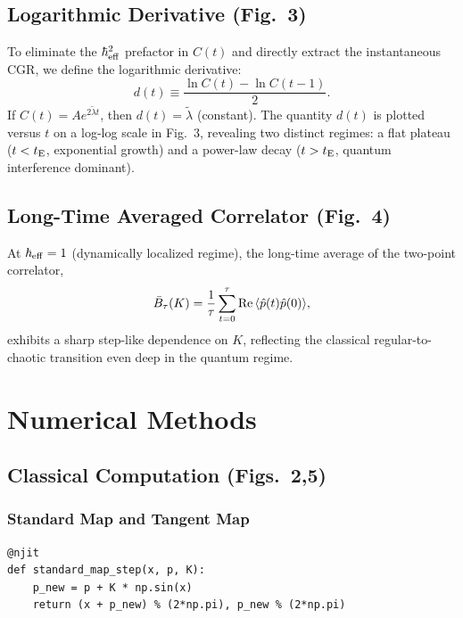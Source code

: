 \documentclass[11pt,a4paper]{article}
\newcommand{\hb}{\hbar_{\rm eff}}
\begin{document}
\subsection{Logarithmic Derivative (Fig.~3)}

To eliminate the $\hb^{2}$ prefactor in $C(t)$ and directly extract the instantaneous CGR, we define the logarithmic derivative:
\begin{equation}\label{eq:logderiv}
d(t)\equiv\frac{\ln C(t)-\ln C(t-1)}{2}.
\end{equation}
If $C(t)=A e^{2\tilde{\lambda}t}$, then $d(t)=\tilde{\lambda}$ (constant). The quantity $d(t)$ is plotted versus $t$ on a log-log scale in Fig.~3, revealing two distinct regimes: a flat plateau ($t<t_{\rm E}$, exponential growth) and a power-law decay ($t>t_{\rm E}$, quantum interference dominant).

\subsection{Long-Time Averaged Correlator (Fig.~4)}

At $\hb=1$ (dynamically localized regime), the long-time average of the two-point correlator,
\begin{equation}\label{eq:Btau}
\bar{B}_{\tau}(K)=\frac{1}{\tau}\sum_{t=0}^{\tau}{\rm Re}\,\langle\hat{p}(t)\hat{p}(0)\rangle,
\end{equation}
exhibits a sharp step-like dependence on $K$, reflecting the classical regular-to-chaotic transition even deep in the quantum regime.

\section{Numerical Methods}

\subsection{Classical Computation (Figs.~2,5)}

\subsubsection*{Standard Map and Tangent Map}

\begin{lstlisting}
@njit
def standard_map_step(x, p, K):
    p_new = p + K * np.sin(x)
    return (x + p_new) % (2*np.pi), p_new % (2*np.pi)
\end{lstlisting}
\end{document}
